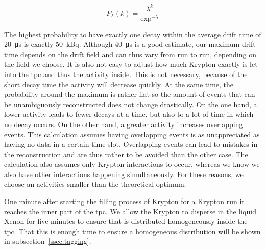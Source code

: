 \begin{equation}
    P_{\lambda}\left(k\right) =  \frac{\lambda^k}{\exp^{-\lambda}}
\end{equation}

The highest probability to have exactly one decay within the average drift time of \SI{20}{\micro\s} is exactly \SI{50}{\kilo\becquerel}.
Although \SI{40}{\micro\s} is a good estimate, our maximum drift time depends on the drift field and can thus vary from run to run, depending on the field we choose.
It is also not easy to adjust how much Krypton exactly is let into the \gls{tpc} and thus the activity inside.
This is not necessary, because of the short decay time the activity will decrease quickly.
At the same time, the probability around the maximum is rather flat so the amount of events that can be unambiguously reconstructed does not change drastically.
On the one hand, a lower activity leads to fewer decays at a time, but also to a lot of time in which no decay occurs.
On the other hand, a greater activity increases overlapping events.
This calculation assumes having overlapping events is as unappreciated as having no data in a certain time slot.
Overlapping events can lead to mistakes in the reconstruction and are thus rather to be avoided than the other case.
The calculation also assumes only Krypton interactions to occur, whereas we know we also have other interactions happening simultaneously.
For these reasons, we choose an activities smaller than the theoretical optimum.


One minute after starting the filling process of Krypton for a Krypton run it reaches the inner part of the \gls{tpc}.
We allow the Krypton to disperse in the liquid Xenon for five minutes to ensure that is distributed homogeneously inside the \gls{tpc}.
That this is enough time to ensure a homogeneous distribution will be shown in subsection~\ref{ssec:tagging}.



\FloatBarrier
